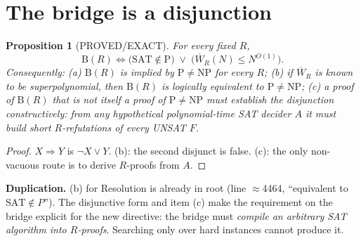 \documentclass[11pt]{article}
\newtheorem{proposition}{Proposition}
\begin{document}
\section{The bridge is a disjunction}
\begin{proposition}[PROVED/EXACT]
For every fixed $R$,
\[
\mathrm B(R)\iff\bigl(\mathrm{SAT}\notin\mathrm P\bigr)\;\lor\;\bigl(\overline W_R(N)\le N^{O(1)}\bigr).
\]
Consequently: (a) $\mathrm B(R)$ is implied by $\mathrm P\ne\mathrm{NP}$ for every $R$;
(b) if $\overline W_R$ is known to be superpolynomial, then $\mathrm B(R)$ is
logically equivalent to $\mathrm P\ne\mathrm{NP}$;
(c) a proof of $\mathrm B(R)$ that is not itself a proof of $\mathrm P\ne\mathrm{NP}$
must establish the disjunction constructively: from any hypothetical
polynomial-time SAT decider $A$ it must build short $R$-refutations of every UNSAT $F$.
\end{proposition}
\begin{proof}
$X\Rightarrow Y$ is $\lnot X\lor Y$. (b): the second disjunct is false. (c): the
only non-vacuous route is to derive $R$-proofs from $A$.
\end{proof}
\noindent\textbf{Duplication.} (b) for Resolution is already in root
 (line $\approx$4464, ``equivalent to $\mathrm{SAT}\notin P$'').
The disjunctive form and item (c) make the requirement on the bridge explicit for
the new directive: the bridge must \emph{compile an arbitrary SAT algorithm into
$R$-proofs}. Searching only over hard instances cannot produce it.
\end{document}
